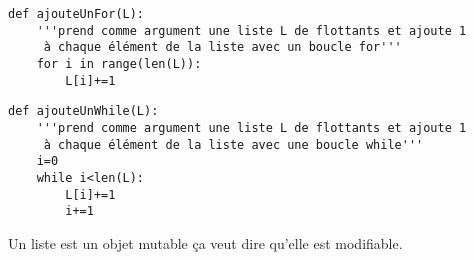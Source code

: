 
\begin{lstlisting}
def ajouteUnFor(L):
    '''prend comme argument une liste L de flottants et ajoute 1
     à chaque élément de la liste avec un boucle for'''
    for i in range(len(L)):
        L[i]+=1
\end{lstlisting}


\begin{lstlisting}
def ajouteUnWhile(L):
    '''prend comme argument une liste L de flottants et ajoute 1
     à chaque élément de la liste avec une boucle while'''
    i=0
    while i<len(L):
        L[i]+=1
        i+=1
 \end{lstlisting}


Un liste est un objet mutable ça veut dire qu'elle est modifiable.